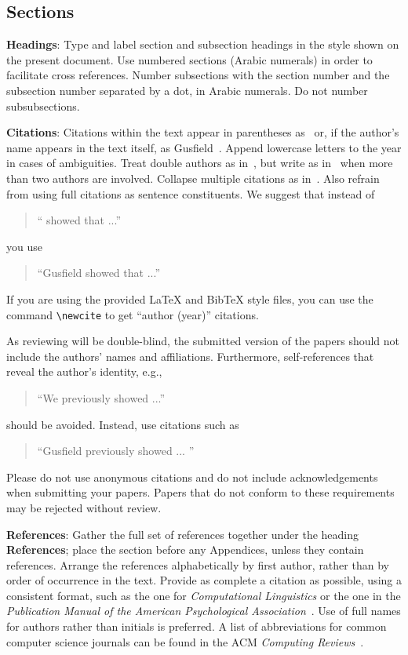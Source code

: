 \documentclass[11pt]{article}
\begin{document}
\subsection{Sections}

{\bf Headings}: Type and label section and subsection headings in the
style shown on the present document.  Use numbered sections (Arabic
numerals) in order to facilitate cross references. Number subsections
with the section number and the subsection number separated by a dot,
in Arabic numerals. Do not number subsubsections.

{\bf Citations}: Citations within the text appear
in parentheses as~\cite{Gusfield:97} or, if the author's name appears in
the text itself, as Gusfield~. Append lowercase letters to the year in cases of ambiguities. Treat double authors as in~\cite{Aho:72}, but write as in~\cite{Chandra:81} when more than two authors are involved. Collapse multiple citations as in~\cite{Gusfield:97,Aho:72}. Also refrain from using full citations as sentence constituents. We suggest that instead of
\begin{quote}
  ``\cite{Gusfield:97} showed that ...''
\end{quote}
you use
\begin{quote}
``Gusfield    showed that ...''
\end{quote}

If you are using the provided \LaTeX{} and Bib\TeX{} style files, you
can use the command \verb|\newcite| to get ``author (year)'' citations.

As reviewing will be double-blind, the submitted version of the papers should not include the
authors' names and affiliations. Furthermore, self-references that
reveal the author's identity, e.g.,
\begin{quote}
``We previously showed \cite{Gusfield:97} ...''
\end{quote}
should be avoided. Instead, use citations such as
\begin{quote}
``Gusfield 
previously showed ... ''
\end{quote}

Please do not  use anonymous
citations and  do not include acknowledgements when submitting your papers. Papers that do not conform
to these requirements may be rejected without review.

\textbf{References}: Gather the full set of references together under
the heading {\bf References}; place the section before any Appendices,
unless they contain references. Arrange the references alphabetically
by first author, rather than by order of occurrence in the text.
Provide as complete a citation as possible, using a consistent format,
such as the one for {\em Computational Linguistics\/} or the one in the
{\em Publication Manual of the American
Psychological Association\/}~\cite{APA:83}.  Use of full names for
authors rather than initials is preferred.  A list of abbreviations
for common computer science journals can be found in the ACM
{\em Computing Reviews\/}~\cite{ACM:83}.
\end{document}
